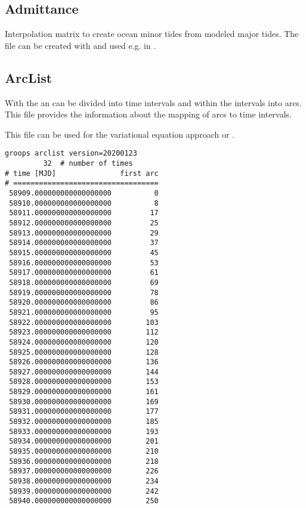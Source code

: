 \subsection{Admittance}\label{general.fileFormat:admittance}
Interpolation matrix to create ocean minor tides from modeled major tides.
The file can be created with  and used e.g. in
.


\subsection{ArcList}\label{general.fileFormat:arcList}
With the  an  can
be divided into time intervals and within the intervals into arcs.
This file provides the information about the mapping of arcs to time intervals.

This file can be used for the variational equation approach or .

\begin{verbatim}
groops arclist version=20200123
         32  # number of times
# time [MJD]               first arc
# ==================================
 58909.000000000000000000          0
 58910.000000000000000000          8
 58911.000000000000000000         17
 58912.000000000000000000         25
 58913.000000000000000000         29
 58914.000000000000000000         37
 58915.000000000000000000         45
 58916.000000000000000000         53
 58917.000000000000000000         61
 58918.000000000000000000         69
 58919.000000000000000000         78
 58920.000000000000000000         86
 58921.000000000000000000         95
 58922.000000000000000000        103
 58923.000000000000000000        112
 58924.000000000000000000        120
 58925.000000000000000000        128
 58926.000000000000000000        136
 58927.000000000000000000        144
 58928.000000000000000000        153
 58929.000000000000000000        161
 58930.000000000000000000        169
 58931.000000000000000000        177
 58932.000000000000000000        185
 58933.000000000000000000        193
 58934.000000000000000000        201
 58935.000000000000000000        210
 58936.000000000000000000        218
 58937.000000000000000000        226
 58938.000000000000000000        234
 58939.000000000000000000        242
 58940.000000000000000000        250
\end{verbatim}


